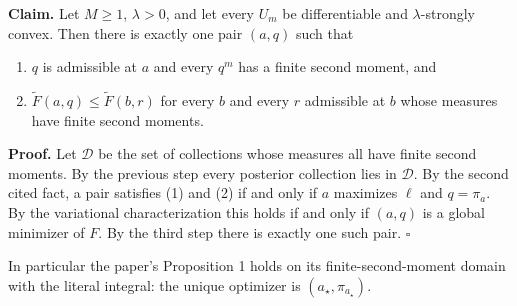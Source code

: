 \documentclass[11pt,a4paper]{report}
\begin{document}
\textbf{Claim.} Let \(M\ge1\), \(\lambda>0\), and let every \(U_m\) be differentiable and \(\lambda\)-strongly convex. Then there is exactly one pair \((a,q)\) such that



\begin{enumerate}


\item \(q\) is admissible at \(a\) and every \(q^m\) has a finite second moment, and

\item \(\widetilde F(a,q)\le\widetilde F(b,r)\) for every \(b\) and every \(r\) admissible at \(b\) whose measures have finite second moments.

\end{enumerate}



\textbf{Proof.} Let \(\mathcal D\) be the set of collections whose measures all have finite second moments. By the previous step every posterior collection lies in \(\mathcal D\). By the second cited fact, a pair satisfies (1) and (2) if and only if \(a\) maximizes \(\ell\) and \(q=\pi_a\). By the variational characterization this holds if and only if \((a,q)\) is a global minimizer of \(F\). By the third step there is exactly one such pair. \(\square\)




In particular the paper's Proposition 1 holds on its finite-second-moment domain with the literal integral: the unique optimizer is \((a_\star,\pi_{a_\star})\).
\end{document}
